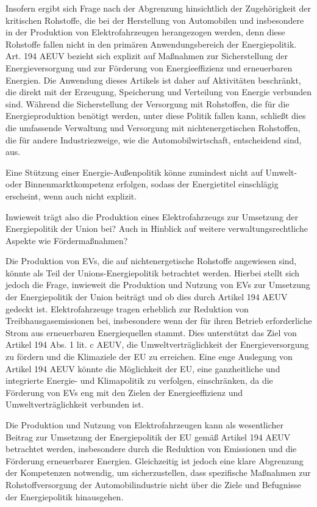 \documentclass[12pt,a4paper,oneside]{book} %
\begin{document}
Insofern ergibt sich Frage nach der Abgrenzung hinsichtlich der Zugehörigkeit der kritischen Rohstoffe, die bei der Herstellung von Automobilen und insbesondere in der Produktion von Elektrofahrzeugen herangezogen werden, denn diese Rohstoffe fallen nicht in den primären Anwendungsbereich der Energiepolitik. Art. 194 AEUV bezieht sich explizit auf Maßnahmen zur Sicherstellung der Energieversorgung und zur Förderung von Energieeffizienz und erneuerbaren Energien. Die Anwendung dieses Artikels ist daher auf Aktivitäten beschränkt, die direkt mit der Erzeugung, Speicherung und Verteilung von Energie verbunden sind. Während die Sicherstellung der Versorgung mit Rohstoffen, die für die Energieproduktion benötigt werden, unter diese Politik fallen kann, schließt dies die umfassende Verwaltung und Versorgung mit nichtenergetischen Rohstoffen, die für andere Industriezweige, wie die Automobilwirtschaft, entscheidend sind, aus.
	
Eine Stützung einer Energie-Außenpolitik könne zumindest nicht auf Umwelt- oder Binnenmarktkompetenz erfolgen, sodass der Energietitel einschlägig erscheint, wenn auch nicht explizit.\autocite{Gundel, Theobald/Kühling, Europäisches Energierecht, V. Rn. 87}
	
Inwieweit trägt also die Produktion eines Elektrofahrzeugs zur Umsetzung der Energiepolitik der Union bei? Auch in Hinblick auf weitere verwaltungsrechtliche Aspekte wie Fördermaßnahmen?

Die Produktion von EVs, die auf nichtenergetische Rohstoffe angewiesen sind, könnte als Teil der Unions-Energiepolitik betrachtet werden. Hierbei stellt sich jedoch die Frage, inwieweit die Produktion und Nutzung von EVs zur Umsetzung der Energiepolitik der Union beiträgt und ob dies durch Artikel 194 AEUV gedeckt ist. Elektrofahrzeuge tragen erheblich zur Reduktion von Treibhausgasemissionen bei, insbesondere wenn der für ihren Betrieb erforderliche Strom aus erneuerbaren Energiequellen stammt. Dies unterstützt das Ziel von Artikel 194 Abs. 1 lit. c AEUV, die Umweltverträglichkeit der Energieversorgung zu fördern und die Klimaziele der EU zu erreichen. Eine enge Auslegung von Artikel 194 AEUV könnte die Möglichkeit der EU, eine ganzheitliche und integrierte Energie- und Klimapolitik zu verfolgen, einschränken, da die Förderung von EVs eng mit den Zielen der Energieeffizienz und Umweltverträglichkeit verbunden ist.

Die Produktion und Nutzung von Elektrofahrzeugen kann als wesentlicher Beitrag zur Umsetzung der Energiepolitik der EU gemäß Artikel 194 AEUV betrachtet werden, insbesondere durch die Reduktion von Emissionen und die Förderung erneuerbarer Energien. Gleichzeitig ist jedoch eine klare Abgrenzung der Kompetenzen notwendig, um sicherzustellen, dass spezifische Maßnahmen zur Rohstoffversorgung der Automobilindustrie nicht über die Ziele und Befugnisse der Energiepolitik hinausgehen.
	
\end{document}
